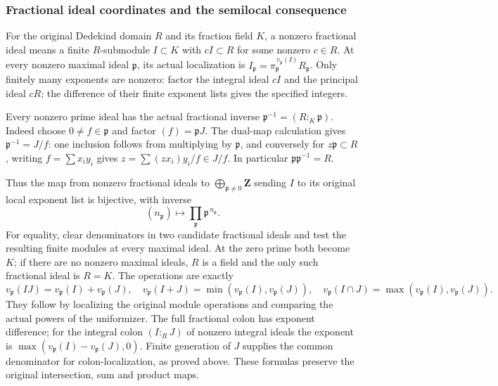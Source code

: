 \subsubsection{Fractional ideal coordinates and the semilocal consequence}\label{algebra-proof-029-fractional-ideal-coordinates-and-the-semilocal-consequence}

For the original Dedekind domain \(R\) and its fraction field \(K\), a nonzero fractional ideal means a finite \(R\)-submodule \(I\subset K\) with \(cI\subset R\) for some nonzero \(c\in R\). At every nonzero maximal ideal \(\mathfrak p\), its actual localization is \(I_{\mathfrak p}=\pi_{\mathfrak p}^{\,v_{\mathfrak p}(I)}R_{\mathfrak p}\). Only finitely many exponents are nonzero: factor the integral ideal \(cI\) and the principal ideal \(cR\); the difference of their finite exponent lists gives the specified integers.

Every nonzero prime ideal has the actual fractional inverse \(\mathfrak p^{-1}=(R:_K\mathfrak p)\). Indeed choose \(0\ne f\in\mathfrak p\) and factor \((f)=\mathfrak p J\). The dual-map calculation gives \(\mathfrak p^{-1}=J/f\): one inclusion follows from multiplying by \(\mathfrak p\), and conversely for \(z\mathfrak p\subset R\), writing \(f=\sum x_i y_i\) gives \(z=\sum(zx_i)y_i/f\in J/f\). In particular \(\mathfrak p\mathfrak p^{-1}=R\).

Thus the map from nonzero fractional ideals to \(\bigoplus_{\mathfrak p\ne0}\mathbf Z\) sending \(I\) to its original local exponent list is bijective, with inverse \[
 (n_{\mathfrak p})\longmapsto\prod_{\mathfrak p}\mathfrak p^{\,n_{\mathfrak p}}.
\] For equality, clear denominators in two candidate fractional ideals and test the resulting finite modules at every maximal ideal. At the zero prime both become \(K\); if there are no nonzero maximal ideals, \(R\) is a field and the only such fractional ideal is \(R=K\). The operations are exactly \[
 v_{\mathfrak p}(IJ)=v_{\mathfrak p}(I)+v_{\mathfrak p}(J),\quad
 v_{\mathfrak p}(I+J)=\min(v_{\mathfrak p}(I),v_{\mathfrak p}(J)),\quad
 v_{\mathfrak p}(I\cap J)=\max(v_{\mathfrak p}(I),v_{\mathfrak p}(J)).
\] They follow by localizing the original module operations and comparing the actual powers of the uniformizer. The full fractional colon has exponent difference; for the integral colon \((I:_R J)\) of nonzero integral ideals the exponent is \(\max(v_{\mathfrak p}(I)-v_{\mathfrak p}(J),0)\). Finite generation of \(J\) supplies the common denominator for colon-localization, as proved above. These formulas preserve the original intersection, sum and product maps.

